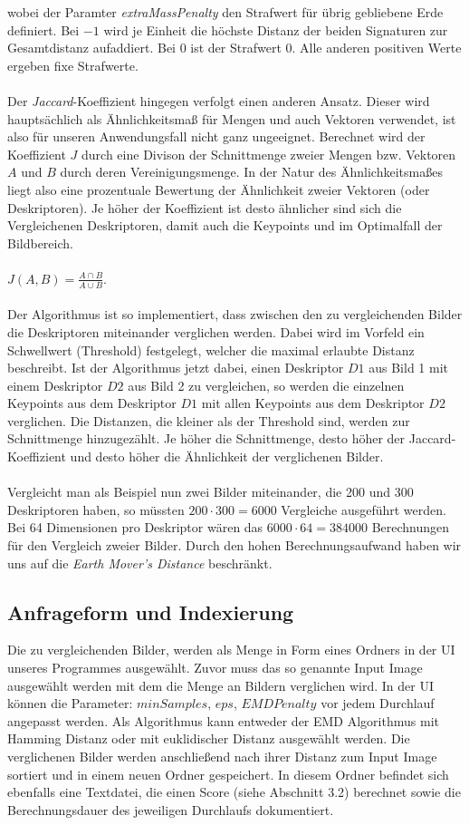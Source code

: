 \documentclass{scrartcl}
\begin{document}
wobei der Paramter \textit{extraMassPenalty} den Strafwert für übrig gebliebene Erde definiert. Bei $-1$ wird je Einheit die höchste Distanz der beiden Signaturen zur Gesamtdistanz aufaddiert. Bei $0$ ist der Strafwert $0$. Alle anderen positiven Werte ergeben fixe Strafwerte.
\\
\\
Der \textit{Jaccard}-Koeffizient hingegen verfolgt einen anderen Ansatz. Dieser wird hauptsächlich als Ähnlichkeitsmaß für Mengen und auch Vektoren verwendet, ist also für unseren Anwendungsfall nicht ganz ungeeignet.
Berechnet wird der Koeffizient $J$ durch eine Divison der Schnittmenge zweier Mengen bzw. Vektoren $A$ und $B$ durch deren Vereinigungsmenge. In der Natur des Ähnlichkeitsmaßes liegt also eine prozentuale Bewertung der Ähnlichkeit zweier Vektoren (oder Deskriptoren). Je höher der Koeffizient ist desto ähnlicher sind sich die Vergleichenen Deskriptoren, damit auch die Keypoints und im Optimalfall der Bildbereich. 
\\
\\
$J(A,B) = \frac {{{A}\cap{B}}}  {{A}\cup{B}}$.
\\
\\
Der Algorithmus ist so implementiert, dass zwischen den zu vergleichenden Bilder die Deskriptoren miteinander verglichen werden. Dabei wird im Vorfeld ein Schwellwert (Threshold) festgelegt, welcher die maximal erlaubte Distanz beschreibt. Ist der Algorithmus jetzt dabei, einen Deskriptor $D1$ aus Bild 1 mit einem Deskriptor $D2$ aus Bild 2 zu vergleichen, so werden die einzelnen Keypoints aus dem Deskriptor $D1$ mit allen Keypoints aus dem Deskriptor $D2$ verglichen. Die Distanzen, die kleiner als der Threshold sind, werden zur Schnittmenge hinzugezählt. Je höher die Schnittmenge, desto höher der Jaccard-Koeffizient und desto höher die Ähnlichkeit der verglichenen Bilder.
\\
\\
Vergleicht man als Beispiel nun zwei Bilder miteinander, die 200 und 300 Deskriptoren haben, so müssten $200 \cdot 300=6000$ Vergleiche ausgeführt werden. Bei 64 Dimensionen pro Deskriptor wären das $6000 \cdot 64 = 384000$ Berechnungen für den Vergleich zweier Bilder. Durch den hohen Berechnungsaufwand haben wir uns auf die \textit{Earth Mover's Distance} beschränkt.


\subsection{Anfrageform und Indexierung}
Die zu vergleichenden Bilder, werden als Menge in Form eines Ordners in der UI unseres Programmes ausgewählt. Zuvor muss das so genannte Input Image ausgewählt werden mit dem die Menge an Bildern verglichen wird. In der UI können die Parameter: $minSamples$, $eps$, $EMD Penalty$ vor jedem Durchlauf angepasst werden. Als Algorithmus kann entweder der EMD Algorithmus mit Hamming Distanz oder mit euklidischer Distanz ausgewählt werden. Die verglichenen Bilder werden anschließend nach ihrer Distanz zum Input Image sortiert und in einem neuen Ordner gespeichert. In diesem Ordner befindet sich ebenfalls eine Textdatei, die einen Score (siehe Abschnitt 3.2) berechnet sowie die Berechnungsdauer des jeweiligen Durchlaufs dokumentiert.
\end{document}
